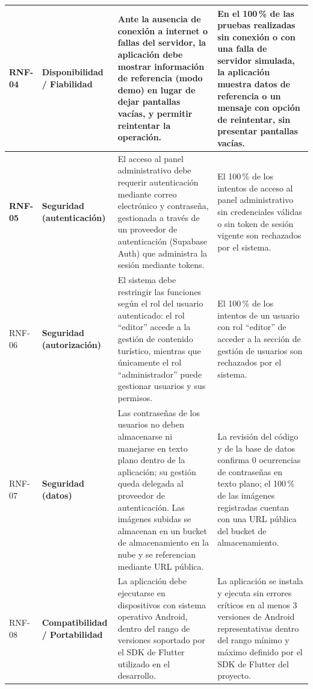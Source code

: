 \begin{longtable}{|>{\bfseries}p{1.2cm}|>{\bfseries}p{2.3cm}|p{4.8cm}|p{4.8cm}|}
RNF-04 & Disponibilidad / Fiabilidad & Ante la ausencia de conexión a internet o fallas del servidor, la aplicación debe mostrar información de referencia (modo demo) en lugar de dejar pantallas vacías, y permitir reintentar la operación. & En el 100\,\% de las pruebas realizadas sin conexión o con una falla de servidor simulada, la aplicación muestra datos de referencia o un mensaje con opción de reintentar, sin presentar pantallas vacías. \\ \hline

RNF-05 & Seguridad (autenticación) & El acceso al panel administrativo debe requerir autenticación mediante correo electrónico y contraseña, gestionada a través de un proveedor de autenticación (Supabase Auth) que administra la sesión mediante tokens. & El 100\,\% de los intentos de acceso al panel administrativo sin credenciales válidas o sin token de sesión vigente son rechazados por el sistema. \\ \hline

RNF-06 & Seguridad (autorización) & El sistema debe restringir las funciones según el rol del usuario autenticado: el rol ``editor'' accede a la gestión de contenido turístico, mientras que únicamente el rol ``administrador'' puede gestionar usuarios y sus permisos. & El 100\,\% de los intentos de un usuario con rol ``editor'' de acceder a la sección de gestión de usuarios son rechazados por el sistema. \\ \hline

RNF-07 & Seguridad (datos) & Las contraseñas de los usuarios no deben almacenarse ni manejarse en texto plano dentro de la aplicación; su gestión queda delegada al proveedor de autenticación. Las imágenes subidas se almacenan en un bucket de almacenamiento en la nube y se referencian mediante URL pública. & La revisión del código y de la base de datos confirma 0 ocurrencias de contraseñas en texto plano; el 100\,\% de las imágenes registradas cuentan con una URL pública del bucket de almacenamiento. \\ \hline

RNF-08 & Compatibilidad / Portabilidad & La aplicación debe ejecutarse en dispositivos con sistema operativo Android, dentro del rango de versiones soportado por el SDK de Flutter utilizado en el desarrollo. & La aplicación se instala y ejecuta sin errores críticos en al menos 3 versiones de Android representativas dentro del rango mínimo y máximo definido por el SDK de Flutter del proyecto. \\ \hline


\end{longtable}
